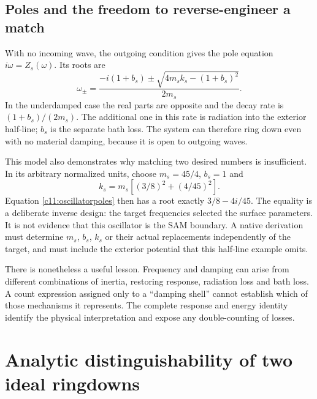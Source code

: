 \subsection{Poles and the freedom to reverse-engineer a match}
With no incoming wave, the outgoing condition gives the pole equation $i\omega=Z_s(\omega)$. Its roots are
\begin{equation}
 \omega_\pm=
 \frac{-i(1+b_s)\pm\sqrt{4m_sk_s-(1+b_s)^2}}{2m_s}.
 \label{c11:oscillatorpoles}
\end{equation}
In the underdamped case the real parts are opposite and the decay rate is $(1+b_s)/(2m_s)$. The additional one in this rate is radiation into the exterior half-line; $b_s$ is the separate bath loss. The system can therefore ring down even with no material damping, because it is open to outgoing waves.

This model also demonstrates why matching two desired numbers is insufficient. In its arbitrary normalized units, choose $m_s=45/4$, $b_s=1$ and
\begin{equation}
 k_s=m_s\left[(3/8)^2+(4/45)^2\right].
 \label{c11:inversechoice}
\end{equation}
Equation \eqref{c11:oscillatorpoles} then has a root exactly $3/8-4i/45$. The equality is a deliberate inverse design: the target frequencies selected the surface parameters. It is not evidence that this oscillator is the SAM boundary. A native derivation must determine $m_s$, $b_s$, $k_s$ or their actual replacements independently of the target, and must include the exterior potential that this half-line example omits.

There is nonetheless a useful lesson. Frequency and damping can arise from different combinations of inertia, restoring response, radiation loss and bath loss. A count expression assigned only to a ``damping shell'' cannot establish which of those mechanisms it represents. The complete response and energy identity identify the physical interpretation and expose any double-counting of losses.

\section{Analytic distinguishability of two ideal ringdowns}
